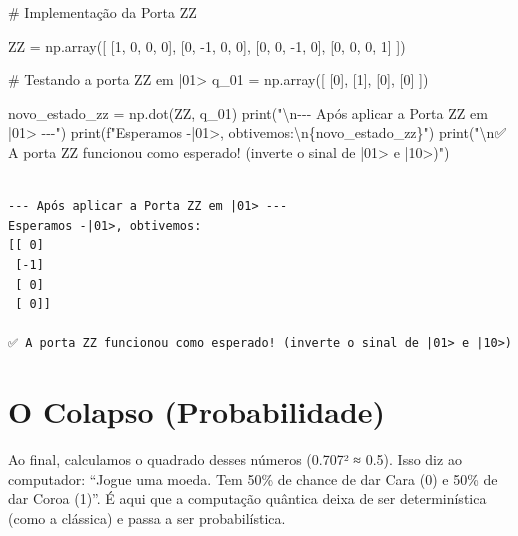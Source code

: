 \documentclass[
  brazilian,
]{report}
\newenvironment{Shaded}{\begin{snugshade}}{\end{snugshade}}
\newcommand{\NormalTok}[1]{\textcolor[rgb]{0.00,0.23,0.31}{#1}}
\begin{document}
\begin{Shaded}
\begin{Highlighting}[]

\NormalTok{\# Implementação da Porta ZZ}

\NormalTok{ZZ = np.array([}
\NormalTok{    [1, 0, 0, 0],}
\NormalTok{    [0, {-}1, 0, 0],}
\NormalTok{    [0, 0, {-}1, 0],}
\NormalTok{    [0, 0, 0, 1]}
\NormalTok{])}

\NormalTok{\# Testando a porta ZZ em |01\textgreater{}}
\NormalTok{q\_01 = np.array([}
\NormalTok{    [0],}
\NormalTok{    [1],}
\NormalTok{    [0],}
\NormalTok{    [0]}
\NormalTok{])}

\NormalTok{novo\_estado\_zz = np.dot(ZZ, q\_01)}
\NormalTok{print("\textbackslash{}n{-}{-}{-} Após aplicar a Porta ZZ em |01\textgreater{} {-}{-}{-}")}
\NormalTok{print(f"Esperamos {-}|01\textgreater{}, obtivemos:\textbackslash{}n\{novo\_estado\_zz\}")}
\NormalTok{print("\textbackslash{}n✅ A porta ZZ funcionou como esperado! (inverte o sinal de |01\textgreater{} e |10\textgreater{})")}
\end{Highlighting}
\end{Shaded}

\begin{verbatim}

--- Após aplicar a Porta ZZ em |01> ---
Esperamos -|01>, obtivemos:
[[ 0]
 [-1]
 [ 0]
 [ 0]]

✅ A porta ZZ funcionou como esperado! (inverte o sinal de |01> e |10>)
\end{verbatim}

\section{O Colapso (Probabilidade)}\label{o-colapso-probabilidade}

Ao final, calculamos o quadrado desses números (0.707² ≈ 0.5). Isso diz
ao computador: ``Jogue uma moeda. Tem 50\% de chance de dar Cara (0) e
50\% de dar Coroa (1)''. É aqui que a computação quântica deixa de ser
determinística (como a clássica) e passa a ser probabilística.
\end{document}
